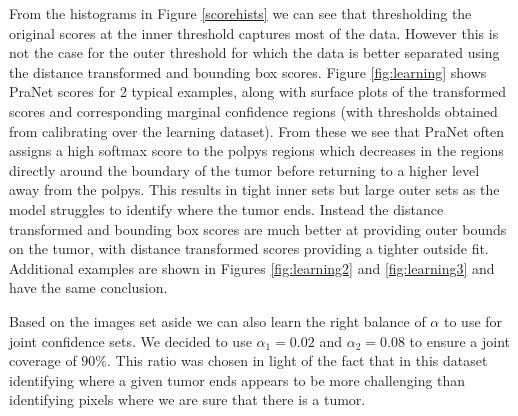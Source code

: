 From the histograms in Figure \ref{scorehists} we can see that thresholding the original scores at the inner threshold captures most of the data. However this is not the case for the outer threshold for which the data is better separated using the distance transformed and bounding box scores. Figure \ref{fig:learning} shows PraNet scores for 2 typical examples, along with surface plots of the transformed scores and corresponding marginal confidence regions (with thresholds obtained from calibrating over the learning dataset). From these we see that PraNet often assigns a high softmax score to the polpys regions which decreases in the regions directly around the  boundary of the tumor before returning to a higher level away from the polpys. This results in tight inner sets but large outer sets as the model struggles to identify where the tumor ends. Instead the distance transformed and bounding box scores are much better at providing outer bounds on the tumor, with distance transformed scores providing a tighter outside fit. Additional examples are shown in Figures \ref{fig:learning2} and \ref{fig:learning3} and have the same conclusion.

Based on the images set aside we can also learn the right balance of $\alpha$ to use for joint confidence sets. We decided to use $\alpha_1 = 0.02$ and $\alpha_2 = 0.08$ to ensure a joint coverage of $90\%$. This ratio was chosen in light of the fact that in this dataset identifying where a given tumor ends appears to be more challenging than identifying pixels where we are sure that there is a tumor.

